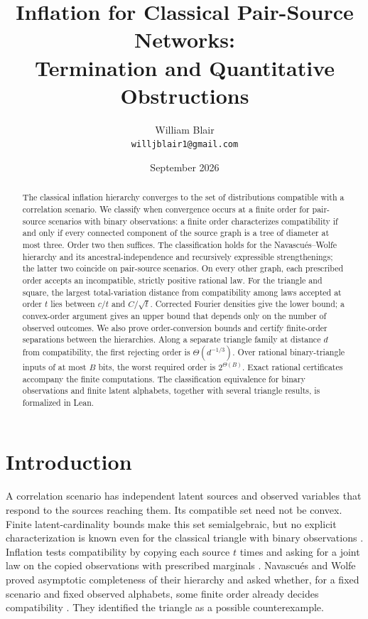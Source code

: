 \documentclass[11pt]{article}
\title{Inflation for Classical Pair-Source Networks:\\ Termination and Quantitative Obstructions}
\author{William Blair\\[2pt]\small\texttt{willjblair1@gmail.com}}
\date{September 2026}
\theoremstyle{plain}
\theoremstyle{definition}
\begin{document}
\maketitle
\vspace{-1em}

\begin{abstract}
The classical inflation hierarchy converges to the set of distributions compatible with a correlation scenario. We classify when convergence occurs at a finite order for pair-source scenarios with binary observations: a finite order characterizes compatibility if and only if every connected component of the source graph is a tree of diameter at most three. Order two then suffices. The classification holds for the Navascués--Wolfe hierarchy and its ancestral-independence and recursively expressible strengthenings; the latter two coincide on pair-source scenarios. On every other graph, each prescribed order accepts an incompatible, strictly positive rational law. For the triangle and square, the largest total-variation distance from compatibility among laws accepted at order $t$ lies between $c/t$ and $C/\sqrt t$. Corrected Fourier densities give the lower bound; a convex-order argument gives an upper bound that depends only on the number of observed outcomes. We also prove order-conversion bounds and certify finite-order separations between the hierarchies. Along a separate triangle family at distance $d$ from compatibility, the first rejecting order is $\Theta(d^{-1/3})$. Over rational binary-triangle inputs of at most $B$ bits, the worst required order is $2^{\Theta(B)}$. Exact rational certificates accompany the finite computations. The classification equivalence for binary observations and finite latent alphabets, together with several triangle results, is formalized in Lean.
\end{abstract}

\begingroup
\footnotesize
\makeatletter
\renewcommand\l@section{\@dottedtocline{1}{0em}{1.8em}}
\makeatother
\tableofcontents
\endgroup
\clearpage

\section{Introduction}\label{sec:intro}

A correlation scenario has independent latent sources and observed variables that respond to the sources reaching them. Its compatible set need not be convex. Finite latent-cardinality bounds make this set semialgebraic, but no explicit characterization is known even for the classical triangle with binary observations \cite{Fritz2012,RGW2018}. Inflation tests compatibility by copying each source $t$ times and asking for a joint law on the copied observations with prescribed marginals \cite{WSF2019}. Navascués and Wolfe proved asymptotic completeness of their hierarchy and asked whether, for a fixed scenario and fixed observed alphabets, some finite order already decides compatibility \cite{NW2020}. They identified the triangle as a possible counterexample.
\end{document}
